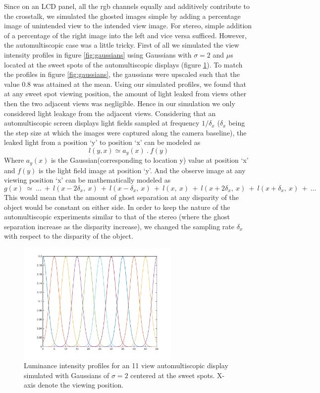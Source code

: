 Since on an LCD panel, all the rgb channels equally and additively contribute to the crosstalk, we simulated the ghosted images simple by adding a percentage image of unintended view to the intended view image. For stereo, simple addition of a percentage of the right image into the left and vice versa sufficed. However, the automultiscopic case was a little tricky. First of all we simulated the view intensity profiles in figure \ref{fig:gaussians} using Gaussians with $\sigma = 2$ and $\mu$s located at the sweet spots of the automultiscopic displays (figure \ref{fig:sim_gaussians}). To match the profiles in figure \ref{fig:gaussians}, the gaussians were upscaled such that the value 0.8 was attained at the mean. Using our simulated profiles, we found that at any sweet spot viewing position, the amount of light leaked from views other then the two adjacent views was negligible. Hence in our simulation we only considered light leakage from the adjacent views. Considering that an automultiscopic screen displays light fields sampled at frequency $1/\delta_x$ ($\delta_x$ being the step size at which the images were captured along the camera baseline), the leaked light from a position `y' to position `x' can be modeled as
\begin{equation}
l(y,x) \simeq a_y(x)\:.\:f(y)
\label{eq:ct_leak_eq}
\end{equation}
Where $a_y(x)$ is the Gaussian(corresponding to location y) value at position `x' and $f(y)$ is the light field image at position `y'. And the observe image  at any viewing position `x' can be mathematically modeled as
\begin{equation}
g(x) \: \simeq \: ...\: +\: l(x-2\delta_x,\:x)\:+\: l(x-\delta_x,\:x)\:+\:l(x,\:x)\:+\: l(x+2\delta_x,\:x)\:+\: l(x+\delta_x,\:x)\:+ \:...
\label{eq:ct_sim_eq}
\end{equation}
This would mean that the amount of ghost separation at any disparity of the object would be constant on either side. In order to keep the nature of the automultiscopic experiments similar to that of the stereo (where the ghost separation increase as the disparity increase), we changed the sampling rate $\delta_x$ with respect to the disparity of the object.
 \begin{figure}
\centering
    \includegraphics[width=0.7\textwidth]{./Template_Figures/sim_gaussians}
    \caption{Luminance intensity profiles for an 11 view automultiscopic display simulated with Gaussians of $\sigma =2$ centered at the sweet spots. X-axis denote the viewing position.\label{fig:sim_gaussians}}
\end{figure}
